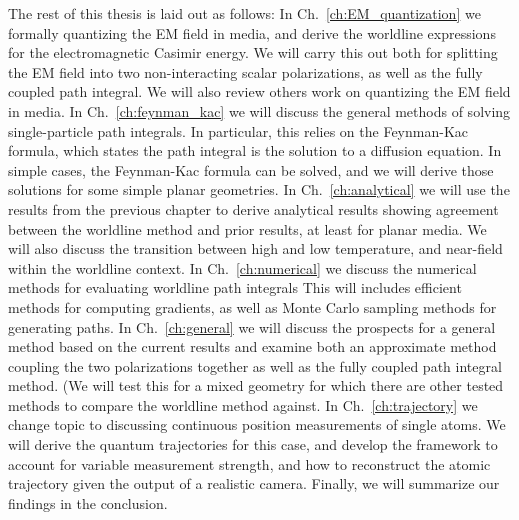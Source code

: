 The rest of this thesis is laid out as follows:  In Ch.~\ref{ch:EM_quantization} we formally quantizing
the EM field in media, and derive the worldline expressions for the electromagnetic Casimir energy.
We will carry this out both for splitting the EM field into two non-interacting scalar polarizations,
as well as the fully coupled path integral.
We will also review others work on quantizing the EM field in media.
In Ch.~\ref{ch:feynman_kac} we will discuss the general methods of solving single-particle path 
integrals.  In particular, this relies on the Feynman-Kac formula, which states the path integral
 is the solution to a diffusion equation.  In simple cases, the Feynman-Kac formula can be solved,
and we will derive those solutions for some simple planar geometries. 
In Ch.~\ref{ch:analytical} we will use the results from the previous chapter to derive analytical 
results showing agreement between the worldline method and prior results, at least for planar media.
We will also discuss the transition between high and low temperature, and near-field within the
worldline context.  
In Ch.~\ref{ch:numerical} we discuss the numerical methods for evaluating worldline path integrals
This will includes efficient methods for computing gradients, as well as Monte Carlo sampling methods
for generating paths. 
In Ch.~\ref{ch:general} we will discuss the prospects for a general method based on the current
results and examine both an approximate method coupling the two polarizations together as well
as the fully coupled path integral method.  (We will test this for a mixed geometry for which
there are other tested methods to compare the worldline method against. 
In Ch.~\ref{ch:trajectory} we change topic to discussing continuous position measurements 
of single atoms.  We will derive the quantum trajectories for this case, and develop the framework
to account for variable measurement strength, and how to reconstruct the atomic trajectory
given the output of a realistic camera.  
Finally, we will summarize our findings in the conclusion.  




